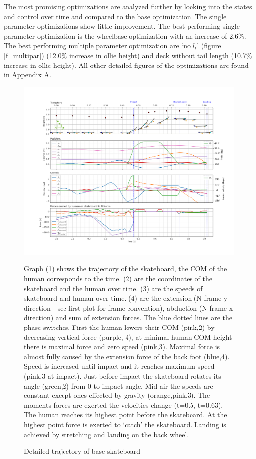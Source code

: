 \documentclass[default,iicol]{sn-jnl}
\begin{document}
The most promising optimizations are analyzed further by looking into the states and control over time and compared to the base optimization. The single parameter optimizations show little improvement. The best performing single parameter optimization is the wheelbase optimization with an increase of 2.6\%. The best performing multiple parameter optimization are `no $l_t$' (figure \ref{f_multipar}) (12.0\% increase in ollie height) and deck without tail length (10.7\% increase in ollie height).  All other detailed figures of the optimizations are found in Appendix A. 
\begin{figure}
    \includegraphics[trim={0cm 0cm 0cm 0cm},clip,width=\textwidth]{figure/Results/data_basedpi600.png}
    \vspace{-1.5cm}\caption[Trajectory, positions, speeds, and forces of base optimization]{
    Detailed trajectory of base skateboard}\label{f_noparameter}
    Graph (1) shows the trajectory of the skateboard, the COM of the human corresponds to the time. (2) are the coordinates of the skateboard and the human over time. (3) are the speeds of skateboard and human over time. (4) are the extension (N-frame y direction - see first plot for frame convention), abduction (N-frame x direction) and sum of extension forces. The blue dotted lines are the phase switches. First the human lowers their COM (pink,2) by decreasing vertical force (purple, 4), at minimal human COM height there is maximal force and zero speed (pink,3). Maximal force is almost fully caused by the extension force of the back foot (blue,4). Speed is increased until impact and it reaches maximum speed (pink,3 at impact). Just before impact the skateboard rotates its angle (green,2) from 0 to impact angle. Mid air the speeds are constant except ones effected by gravity (orange,pink,3). The moments forces are exerted the velocities change (t=0.5, t=0.63). The human reaches its highest point before the skateboard. At the highest point force is exerted to `catch' the skateboard. Landing is achieved by stretching and landing on the back wheel.
    
\end{figure}
\end{document}
